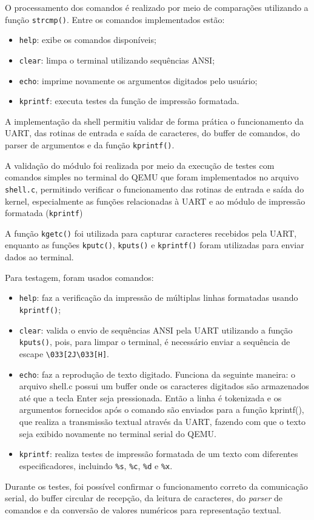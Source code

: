 O processamento dos comandos é realizado por meio de comparações utilizando a função \texttt{strcmp()}. Entre os comandos implementados estão:

\begin{itemize}
    \item \texttt{help}: exibe os comandos disponíveis;
    \item \texttt{clear}: limpa o terminal utilizando sequências ANSI;
    \item \texttt{echo}: imprime novamente os argumentos digitados pelo usuário;
    \item \texttt{kprintf}: executa testes da função de impressão formatada.
\end{itemize}

A implementação da shell permitiu validar de forma prática o funcionamento da UART, das rotinas de entrada e saída de caracteres, do buffer de comandos, do parser de argumentos e da função \texttt{kprintf()}.

A validação do módulo foi realizada por meio da execução de testes com comandos simples no terminal do QEMU  que foram implementados no arquivo \texttt{shell.c}, permitindo verificar o funcionamento das rotinas de entrada e saída do kernel, especialmente as funções relacionadas à UART e ao módulo de impressão formatada (\texttt{kprintf})

A função \texttt{kgetc()} foi utilizada para capturar caracteres recebidos pela UART, enquanto as funções \texttt{kputc()}, \texttt{kputs()} e \texttt{kprintf()} foram utilizadas para enviar dados ao terminal.

Para testagem, foram usados comandos:

\begin{itemize}
    \item \texttt{help}: faz a verificação da impressão de múltiplas linhas formatadas usando \texttt{kprintf()};
    
    \item \texttt{clear}: valida o envio de sequências ANSI pela UART utilizando a função \texttt{kputs()}, pois, para limpar o terminal, é necessário enviar a sequência de escape \texttt{\textbackslash033[2J\textbackslash033[H]}.
    
    \item \texttt{echo}: faz a reprodução de texto digitado. Funciona da seguinte maneira: o arquivo shell.c possui um buffer onde os caracteres digitados são armazenados até que a tecla Enter seja pressionada. Então a linha é tokenizada e os argumentos fornecidos após o comando são enviados para a função kprintf(), que realiza a transmissão textual através da UART, fazendo com que o texto seja exibido novamente no terminal serial do QEMU.
    
    \item \texttt{kprintf}: realiza testes de impressão formatada de um texto com diferentes especificadores, incluindo \texttt{\%s}, \texttt{\%c}, \texttt{\%d} e \texttt{\%x}.
\end{itemize}

Durante os testes, foi possível confirmar o funcionamento correto da comunicação serial, do buffer circular de recepção, da leitura de caracteres, do \textit{parser} de comandos e da conversão de valores numéricos para representação textual.


